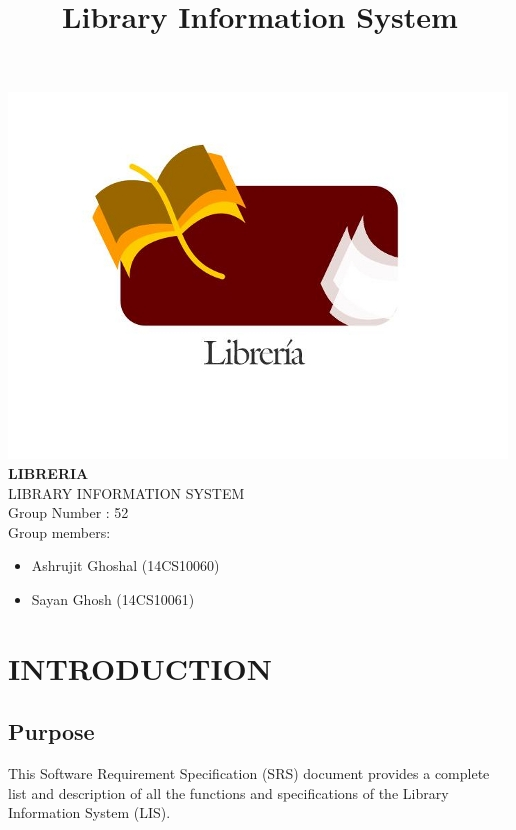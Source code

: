 \documentclass{article}
\title{\textbf{Library Information System}}
\author{}
\date{}
\begin{document}
\maketitle
\begin{center}
\includegraphics[scale=0.6]{images/logoLIS_modified.jpg}
\\
\textbf{LIBRERIA}\\
LIBRARY INFORMATION SYSTEM\\
Group Number : 52\\
Group members: \\
\begin{itemize}
\item \begin{center}Ashrujit Ghoshal (14CS10060)\end{center}
\item \begin{center}Sayan Ghosh (14CS10061)\end{center}
\end{itemize}

\end{center}

\newpage
\hypertarget{toc}{}
\tableofcontents
\newpage

\section{INTRODUCTION}

\subsection{Purpose}
This Software Requirement Specification (SRS) document provides a complete list and description of all the functions and specifications of the Library Information System (LIS).
\end{document}
